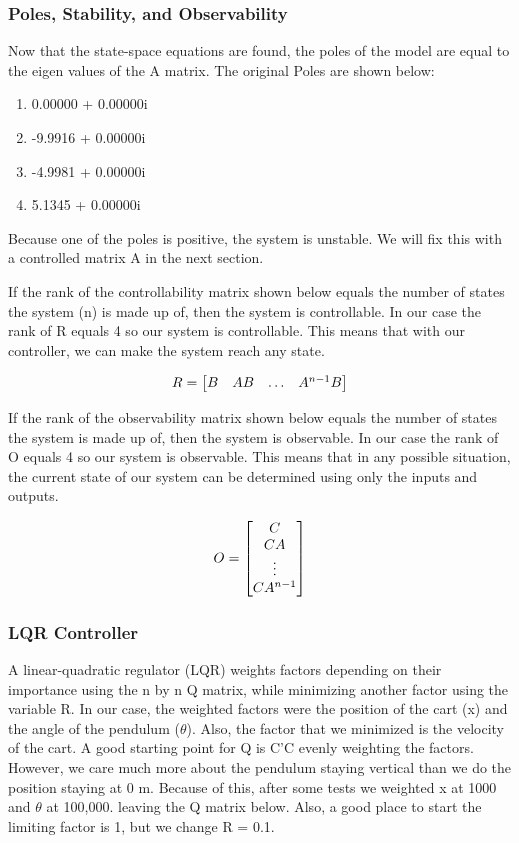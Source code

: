 \documentclass{article}
\begin{document}
\subsubsection{Poles, Stability, and Observability}
Now that the state-space equations are found, the poles of the model are equal to the eigen values of the A matrix. The original Poles are shown below:
\begin{enumerate}
  \item   0.00000 + 0.00000i
  \item -9.9916 + 0.00000i
  \item -4.9981 + 0.00000i
  \item 5.1345 + 0.00000i
\end{enumerate}
Because one of the poles is positive, the system is unstable. We will fix this with a controlled matrix A in the next section.

If the rank of the controllability matrix shown below equals the number of states the system (n) is made up of, then the system is controllable. In our case the rank of R equals 4 so our system is controllable. This means that with our controller, we can make the system reach any state.

\begin{equation} 
\label{ctrb}
\centering
R = \begin{bmatrix}
	B&AB&\hdots&A^{n-1}B\\
	\end{bmatrix}
\end{equation}
 
 If the rank of the observability matrix shown below equals the number of states the system is made up of, then the system is observable. In our case the rank of O equals 4 so our system is observable. This means that in any possible situation, the current state of our system can be determined using only the inputs and outputs.
 
 \begin{equation} 
\label{obsv}
\centering
O = \begin{bmatrix}
	C\\
	CA\\
	\vdots\\
	CA^{n-1}\\
	\end{bmatrix}
\end{equation}

\subsubsection{LQR Controller}
A linear-quadratic regulator (LQR) weights factors depending on their importance using the n by n Q matrix, while minimizing another factor using the variable R. In our case, the weighted factors were the position of the cart (x) and the angle of the pendulum ($\theta$). Also, the factor that we minimized is the velocity of the cart. A good starting point for Q is C'C evenly weighting the factors. However, we care much more about the pendulum staying vertical than we do the position staying at 0 m. Because of this, after some tests we weighted x at 1000 and $\theta$ at 100,000. leaving the Q matrix below. Also, a good place to start the limiting factor is 1, but we change R = 0.1.
\end{document}
